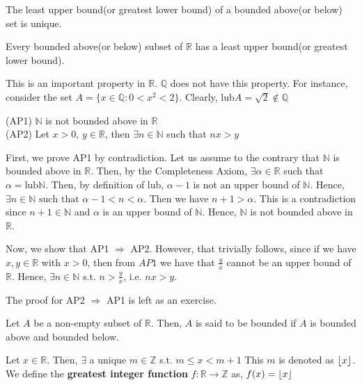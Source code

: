 \documentclass{scrartcl}
\newcommand{\rn}{\mathbb{R}}
\newcommand{\nn}{\mathbb{N}}
\newcommand{\q}{\mathbb{Q}}
\newcommand{\z}{\mathbb{Z}}
\newcommand{\lub}{\text{lub}}
\begin{document}
    \begin{theorem}
        The least upper bound(or greatest lower bound) of a bounded above(or below) set is unique.
    \end{theorem}
    \begin{definition}
        Every bounded above(or below) subset of $\rn$ has a least upper bound(or greatest lower bound).
    \end{definition}
    \begin{remark}    
        This is an important property in $\rn$. $\q$ does not have this property. For instance, consider 
        the set $A = \{ x\in \q : 0<x^2<2\}$. Clearly, $\text{lub}A = \sqrt{2} \notin \q$
    \end{remark}
    \begin{theorem}
        (AP1) $\nn$ is not bounded above in $\rn$ \\
        (AP2) Let $x>0$, $y \in \rn$, then $\exists n \in \nn$ such that $nx > y$
        \begin{proof*}
            First, we prove AP1 by contradiction. Let us assume to the contrary that $\nn$ is bounded above
            in $\rn$. Then, by the Completeness Axiom, $\exists \alpha \in \rn$ such that $\alpha = \lub \nn$. Then, by definition of lub, 
            $\alpha -1$ is not an upper bound of $\nn$. Hence, $\exists n \in \nn \text{ such that } \alpha -1<n<\alpha$. Then 
            we have $n +1 > \alpha$. This is a contradiction since $n + 1 \in \nn$ and $\alpha$ is an upper bound of $\nn$. Hence, $\nn$ is not bounded above
            in $\rn$.

            Now, we show that AP1 $\Rightarrow$ AP2. However, that trivially follows, since if we have $x, y \in \rn$ with 
            $x > 0$, then from $AP1$ we have that $\frac{y}{x}$ cannot be an upper bound of $\rn$. Hence, 
            $\exists n \in \nn \text{ s.t. } n > \frac{y}{x}$, i.e. $nx > y$.

            The proof for AP2 $\Rightarrow$ AP1 is left as an exercise.
        \end{proof*}
    \end{theorem}
    \begin{definition}
        Let $A$ be a non-empty subset of $\rn$. Then, $A$ is said to be bounded if $A$ is bounded above and bounded below.
    \end{definition}
    \begin{theorem}
        Let $x \in \rn$. Then, $\exists$ a unique $m \in \z$ s.t. $m \leq x < m+1$
        This $m$ is denoted as $\left\lfloor x \right\rfloor$. We define the \textbf{greatest integer function} $f : \rn \to \z$ as, $f(x) = \left\lfloor x \right\rfloor$
    \end{theorem}
\end{document}
